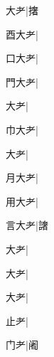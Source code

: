 \begin{multicols}{2}
{{大耂}\mktsJzrVerticalBar{}{\cjk{}{\cnsym{}　}{\cnsym{}　}{\cnsym{}　}}|{\cjk{}撦}\par
{\cjk{}酉大耂}\mktsJzrVerticalBar{}{\cjk{}{\cnsym{}　}{\cnsym{}　}{\cnsym{}　}}|{}\par
{\cjk{}口大耂}\mktsJzrVerticalBar{}{\cjk{}{\cnsym{}　}{\cnsym{}　}{\cnsym{}　}}|{}\par
{\cjk{}門大耂}\mktsJzrVerticalBar{}{\cjk{}{\cnsym{}　}{\cnsym{}　}{\cnsym{}　}}|{}\par
{大耂}\mktsJzrVerticalBar{}{\cjk{}{\cnsym{}　}{\cnsym{}　}{\cnsym{}　}}|{}\par
{\cjk{}巾大耂}\mktsJzrVerticalBar{}{\cjk{}{\cnsym{}　}{\cnsym{}　}{\cnsym{}　}}|{}\par
{大耂}\mktsJzrVerticalBar{}{\cjk{}{\cnsym{}　}{\cnsym{}　}{\cnsym{}　}}|{}\par
{\cjk{}月大耂}\mktsJzrVerticalBar{}{\cjk{}{\cnsym{}　}{\cnsym{}　}{\cnsym{}　}}|{}\par
{\cjk{}用大耂}|{}\par
{\cjk{}言大耂}\mktsJzrVerticalBar{}{\cjk{}{\cnsym{}　}{\cnsym{}　}{\cnsym{}　}}|{\cjk{}譇}\par
{大耂}\mktsJzrVerticalBar{}{\cjk{}{\cnsym{}　}{\cnsym{}　}{\cnsym{}　}}|{}\par
{大耂}\mktsJzrVerticalBar{}{\cjk{}{\cnsym{}　}{\cnsym{}　}{\cnsym{}　}}|{}\par
{大耂}\mktsJzrVerticalBar{}{\cjk{}{\cnsym{}　}{\cnsym{}　}{\cnsym{}　}}|{}\par
{\cjk{}{\cnsym{}　}止耂}\mktsJzrVerticalBar{}{\cjk{}{\cnsym{}　}{\cnsym{}　}{\cnsym{}　}}|{}\par
{\cjk{}{\cnsym{}　}门耂}\mktsJzrVerticalBar{}{\cjk{}{\cnsym{}　}{\cnsym{}　}{\cnsym{}　}}|{\cjk{}阇}\par
}
\end{multicols}
